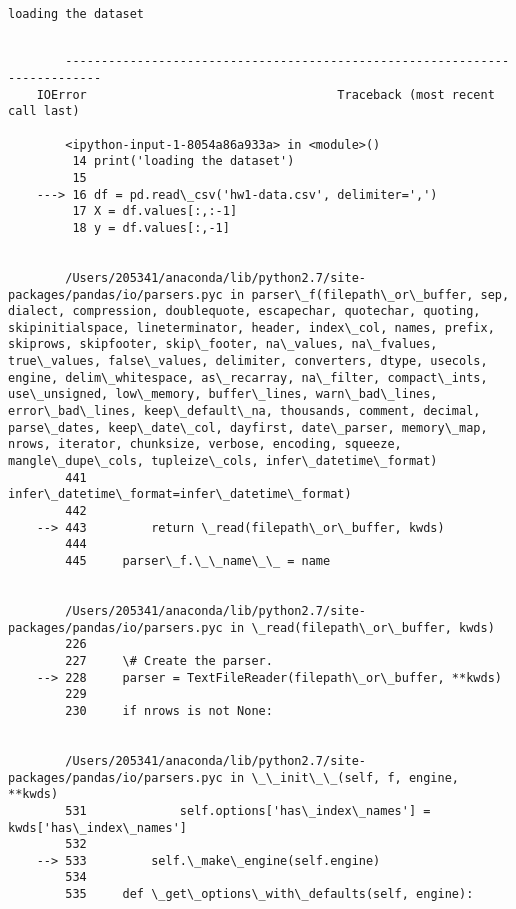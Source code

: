 \documentclass{article}
\begin{document}
    \begin{Verbatim}[commandchars=\\\{\}]
loading the dataset
    \end{Verbatim}

    \begin{Verbatim}[commandchars=\\\{\}]

        ---------------------------------------------------------------------------
    IOError                                   Traceback (most recent call last)

        <ipython-input-1-8054a86a933a> in <module>()
         14 print('loading the dataset')
         15 
    ---> 16 df = pd.read\_csv('hw1-data.csv', delimiter=',')
         17 X = df.values[:,:-1]
         18 y = df.values[:,-1]


        /Users/205341/anaconda/lib/python2.7/site-packages/pandas/io/parsers.pyc in parser\_f(filepath\_or\_buffer, sep, dialect, compression, doublequote, escapechar, quotechar, quoting, skipinitialspace, lineterminator, header, index\_col, names, prefix, skiprows, skipfooter, skip\_footer, na\_values, na\_fvalues, true\_values, false\_values, delimiter, converters, dtype, usecols, engine, delim\_whitespace, as\_recarray, na\_filter, compact\_ints, use\_unsigned, low\_memory, buffer\_lines, warn\_bad\_lines, error\_bad\_lines, keep\_default\_na, thousands, comment, decimal, parse\_dates, keep\_date\_col, dayfirst, date\_parser, memory\_map, nrows, iterator, chunksize, verbose, encoding, squeeze, mangle\_dupe\_cols, tupleize\_cols, infer\_datetime\_format)
        441                     infer\_datetime\_format=infer\_datetime\_format)
        442 
    --> 443         return \_read(filepath\_or\_buffer, kwds)
        444 
        445     parser\_f.\_\_name\_\_ = name


        /Users/205341/anaconda/lib/python2.7/site-packages/pandas/io/parsers.pyc in \_read(filepath\_or\_buffer, kwds)
        226 
        227     \# Create the parser.
    --> 228     parser = TextFileReader(filepath\_or\_buffer, **kwds)
        229 
        230     if nrows is not None:


        /Users/205341/anaconda/lib/python2.7/site-packages/pandas/io/parsers.pyc in \_\_init\_\_(self, f, engine, **kwds)
        531             self.options['has\_index\_names'] = kwds['has\_index\_names']
        532 
    --> 533         self.\_make\_engine(self.engine)
        534 
        535     def \_get\_options\_with\_defaults(self, engine):



\end{Verbatim}
\end{document}
